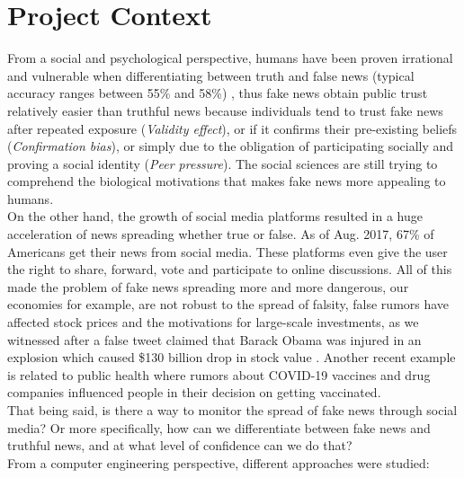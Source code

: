 \documentclass[10pt, english]{report}
\begin{document}
\section{Project Context}

From a social and psychological perspective, humans have been proven irrational and vulnerable when differentiating between truth and false news (typical accuracy ranges between 55\% and 58\%) \cite{zhou2019fake}, thus fake news obtain public trust relatively easier than truthful news because individuals tend to trust fake news after repeated exposure (\textit{Validity effect}), or if it confirms their pre-existing beliefs (\textit{Confirmation bias}), or simply due to the obligation of participating socially and proving a social identity (\textit{Peer pressure}). The social sciences are still trying to comprehend the biological motivations that makes fake news more appealing to humans.\\

On the other hand, the growth of social media platforms resulted in a huge acceleration of news spreading whether true or false. As of Aug. 2017, 67\% \cite{zhou2019fake} of Americans get their news from social media. These platforms even give the user the right to share, forward, vote and participate to online discussions. All of this made the problem of fake news spreading more and more dangerous, our economies for example, are not robust to the spread of falsity, false rumors have affected stock prices and the motivations for large-scale investments, as we witnessed after a false tweet claimed that Barack Obama was injured in an explosion which caused \$130 billion drop in stock value \cite{vosoughi2018spread}. Another recent example is related to public health where rumors about COVID-19 vaccines and drug companies influenced people in their decision on getting vaccinated.\\

That being said, is there a way to monitor the spread of fake news through social media? Or more specifically, how can we differentiate between fake news and truthful news, and at what level of confidence can we do that?\\

From a computer engineering perspective, different approaches were studied:
\end{document}
